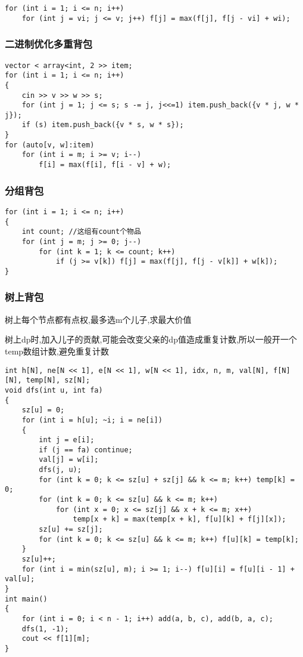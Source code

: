 \documentclass[a4paper, fontset=none]{ctexart}
\begin{document}
\begin{verbatim}
for (int i = 1; i <= n; i++)
    for (int j = vi; j <= v; j++) f[j] = max(f[j], f[j - vi] + wi);
\end{verbatim}

\subsubsection{二进制优化多重背包}

\begin{verbatim}
vector < array<int, 2 >> item;
for (int i = 1; i <= n; i++)
{
    cin >> v >> w >> s;
    for (int j = 1; j <= s; s -= j, j<<=1) item.push_back({v * j, w * j});
    if (s) item.push_back({v * s, w * s});
}
for (auto[v, w]:item)
    for (int i = m; i >= v; i--)
        f[i] = max(f[i], f[i - v] + w);
\end{verbatim}
\subsubsection{分组背包}

\begin{verbatim}
for (int i = 1; i <= n; i++)
{
    int count; //这组有count个物品
    for (int j = m; j >= 0; j--)
        for (int k = 1; k <= count; k++)
            if (j >= v[k]) f[j] = max(f[j], f[j - v[k]] + w[k]);
}
\end{verbatim}
\subsubsection{树上背包}

树上每个节点都有点权,最多选m个儿子,求最大价值

树上dp时,加入儿子的贡献,可能会改变父亲的dp值造成重复计数,所以一般开一个temp数组计数,避免重复计数

\begin{verbatim}
int h[N], ne[N << 1], e[N << 1], w[N << 1], idx, n, m, val[N], f[N][N], temp[N], sz[N];
void dfs(int u, int fa)
{
    sz[u] = 0;
    for (int i = h[u]; ~i; i = ne[i])
    {
        int j = e[i];
        if (j == fa) continue;
        val[j] = w[i];
        dfs(j, u);
        for (int k = 0; k <= sz[u] + sz[j] && k <= m; k++) temp[k] = 0;
        for (int k = 0; k <= sz[u] && k <= m; k++)
            for (int x = 0; x <= sz[j] && x + k <= m; x++)
                temp[x + k] = max(temp[x + k], f[u][k] + f[j][x]);
        sz[u] += sz[j];
        for (int k = 0; k <= sz[u] && k <= m; k++) f[u][k] = temp[k];
    }
    sz[u]++;
    for (int i = min(sz[u], m); i >= 1; i--) f[u][i] = f[u][i - 1] + val[u];
}
int main()
{
    for (int i = 0; i < n - 1; i++) add(a, b, c), add(b, a, c);
    dfs(1, -1);
    cout << f[1][m];
}
\end{verbatim}
\end{document}
